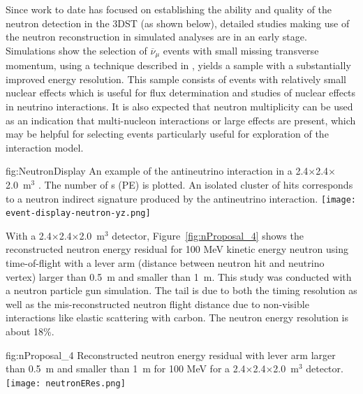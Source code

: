 Since work to date has focused on establishing the ability and quality of the neutron detection in the 3DST (as shown below), detailed studies making use of the neutron reconstruction in simulated analyses are in an early stage.  Simulations show the selection of $\overline{\nu}_\mu$  events with small missing transverse momentum, using a technique described in \cite{Abe:2018pwo}, yields a sample with a substantially improved energy resolution.  This sample consists of events with relatively small nuclear effects which is useful for flux determination and studies of nuclear effects in neutrino interactions.  It is also expected that neutron multiplicity can  be used as an indication that multi-nucleon interactions or large  effects are present, which may be helpful for selecting  events particularly useful for exploration of the interaction model.

\begin{dunefigure}{fig:NeutronDisplay}
{An example of the antineutrino
interaction in a 2.4$\times$2.4$\times$2.0~m$^{3}$ . 
The number of \phel{}s (PE) is plotted.
An isolated cluster of hits 
corresponds to a neutron indirect signature produced by the antineutrino interaction.}
  \texttt{[image: event-display-neutron-yz.png]}
\end{dunefigure}

With a 2.4$\times$2.4$\times$2.0~m$^{3}$  detector, Figure~\ref{fig:nProposal_4} shows 
the reconstructed neutron energy residual for 100 MeV kinetic energy neutron using time-of-flight with a lever arm (distance between neutron hit and neutrino vertex) larger than 0.5~m and smaller than 1~m.
This study was conducted with a neutron particle gun simulation.
The tail is due to both the timing resolution as well as the mis-reconstructed neutron flight distance due to non-visible interactions like elastic scattering with carbon.
The neutron energy resolution is about 18\%. \\
\begin{dunefigure}{fig:nProposal_4}
{Reconstructed neutron energy residual with lever arm larger than 0.5~m and smaller than 1~m for 100 MeV for a 2.4$\times$2.4$\times$2.0~m$^{3}$  detector.}
  \texttt{[image: neutronERes.png]}
\end{dunefigure}

